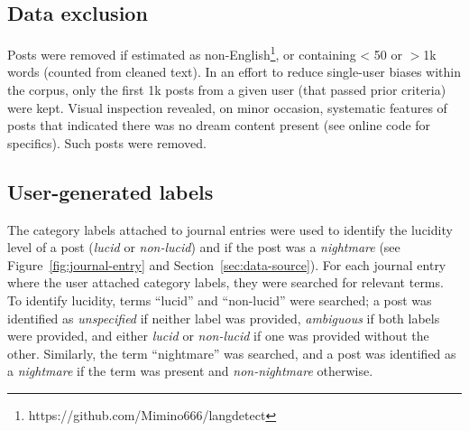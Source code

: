 \documentclass[10pt,a4paper,twocolumn]{article}
\begin{document}
\subsection{Data exclusion}\label{sec:data-exclusion}

Posts were removed if estimated as non-English\footnote{https://github.com/Mimino666/langdetect}, or containing \num{< 50} or $>$1k words (counted from cleaned text). In an effort to reduce single-user biases within the corpus, only the first 1k posts from a given user (that passed prior criteria) were kept. Visual inspection revealed, on minor occasion, systematic features of posts that indicated there was no dream content present (see online code for specifics). Such posts were removed.

\subsection{User-generated labels}\label{sec:automated-labeling}

The category labels attached to journal entries were used to identify the lucidity level of a post (\emph{lucid} or \emph{non-lucid}) and if the post was a \emph{nightmare} (see Figure~\ref{fig:journal-entry} and Section~\ref{sec:data-source}). For each journal entry where the user attached category labels, they were searched for relevant terms. To identify lucidity, terms ``lucid'' and ``non-lucid'' were searched; a post was identified as \emph{unspecified} if neither label was provided, \emph{ambiguous} if both labels were provided, and either \emph{lucid} or \emph{non-lucid} if one was provided without the other. Similarly, the term ``nightmare'' was searched, and a post was identified as a \emph{nightmare} if the term was present and \emph{non-nightmare} otherwise.
\end{document}

